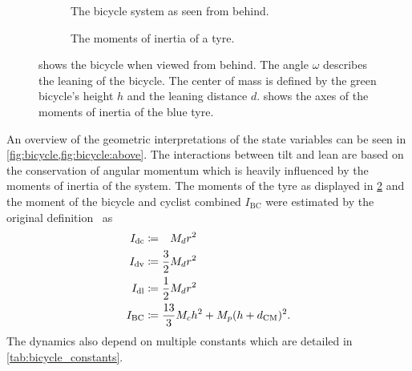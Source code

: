 \begin{figure}[p]
    \centering
    \begin{subfigure}[b]{\subfigurewidth}
        \centering
        
        \caption{
            The bicycle system as seen from behind.
        }
        \label{fig:bicycle:behind}
    \end{subfigure}
    \begin{subfigure}[b]{\subfigurewidth}
        \centering
        
        \caption{
            The moments of inertia of a tyre.
        }
        \label{fig:bicycle:inertia}
    \end{subfigure}
    \caption[The bicycle system as seen from behind and moments of inertia]{
         shows the bicycle when viewed from behind.
        The angle $\omega$ describes the leaning of the bicycle.
        The center of mass is defined by the green bicycle's height $h$ and the leaning distance $d$.
         shows the axes of the moments of inertia of the blue tyre.
    }
    \label{fig:bicycle}
\end{figure}

An overview of the geometric interpretations of the state variables can be seen in \cref{fig:bicycle,fig:bicycle:above}.
The interactions between tilt and lean are based on the conservation of angular momentum which is heavily influenced by the moments of inertia of the system.
The moments of the tyre as displayed in \cref{fig:bicycle:inertia} and the moment of the bicycle and cyclist combined $I_{\text{BC}}$ were estimated by the original definition~\cite{randlov_learning_1998} as
\begin{align}
    I_{\text{dc}} &\coloneqq \hphantom{\frac{1}{2}}M_d r^2\\
    I_{\text{dv}} &\coloneqq \frac{3}{2}M_d r^2\\
    I_{\text{dl}} &\coloneqq \frac{1}{2}M_d r^2\\
    I_{\text{BC}} &\coloneqq \frac{13}{3} M_c h^2 + M_p(h + d_\CM)^2.
\end{align}
The dynamics also depend on multiple constants which are detailed in \cref{tab:bicycle_constants}.


